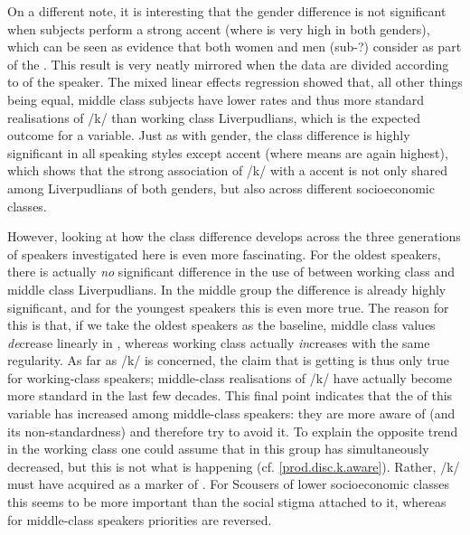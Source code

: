 On a different note, it is interesting that the gender difference is not significant when subjects perform a strong  accent (where  is very high in both genders), which can be seen as evidence that both women and men (sub-?) consider  as part of the  .
This result is very neatly mirrored when the data are divided according to  of the speaker.
The mixed linear effects regression showed that, all other things being equal, middle class subjects have lower  rates and thus more standard realisations of /k/ than working class Liverpudlians, which is the expected outcome for a  variable.
Just as with gender, the class difference is highly significant in all speaking styles except accent  (where  means are again highest), which shows that the strong association of /k/  with a   accent is not only shared among Liverpudlians of both genders, but also across different socioeconomic classes.

However, looking at how the class difference develops across the three generations of speakers investigated here is even more fascinating.
For the oldest speakers, there is actually \emph{no} significant difference in the use of  between working class and middle class Liverpudlians.
In the middle group the difference is already highly significant, and for the youngest speakers this is even more true.
The reason for this is that, if we take the oldest speakers as the baseline, middle class  values \emph{de}crease linearly in , whereas working class  actually \emph{in}creases with the same regularity.
As far as /k/  is concerned, the claim that  is getting  is thus only true for working-class speakers; middle-class realisations of /k/ have actually become more standard in the last few decades.
This final point indicates that the  of this variable has increased among middle-class speakers: they are more aware of  (and its non-standardness) and therefore try to avoid it.
To explain the opposite trend in the working class one could assume that  in this group has simultaneously decreased, but this is not what is happening (cf. \ref{prod.disc.k.aware}).
Rather, /k/  must have acquired   as a marker of .
For Scousers of lower socioeconomic classes this   seems to be more important than the social stigma attached to it, whereas for middle-class speakers priorities are reversed.

